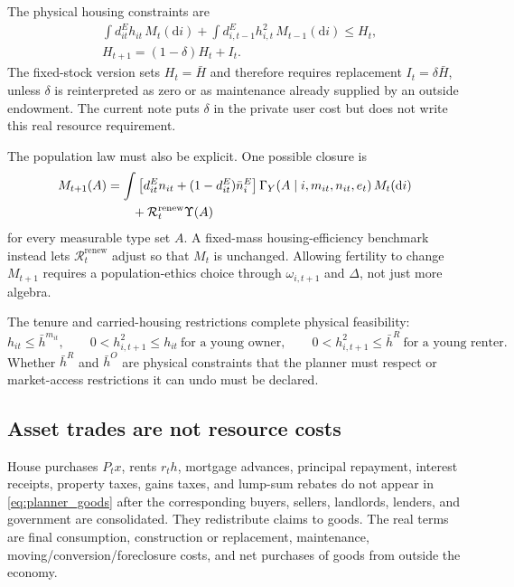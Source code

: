 \documentclass[11pt]{article}
\newcommand{\dd}{\mathrm d}
\newcommand{\1}{\mathbf 1}
\begin{document}
The physical housing constraints are
\begin{align}
&\int d_{it}^E h_{it}\,M_t(\dd i)
+\int d_{i,t-1}^E h_{i,t}^2\,M_{t-1}(\dd i)
\le H_t,
\label{eq:planner_housing}\\
&H_{t+1}=(1-\delta)H_t+I_t.
\label{eq:stock_law}
\end{align}
The fixed-stock version sets $H_t=\bar H$ and therefore requires replacement
$I_t=\delta\bar H$, unless $\delta$ is reinterpreted as zero or as maintenance
already supplied by an outside endowment. The current note puts $\delta$ in
the private user cost but does not write this real resource requirement.

The population law must also be explicit. One possible closure is
\begin{align}
M_{t+1}(A)
&=\int
\left[d_{it}^E n_{it}+(1-d_{it}^E)\bar n_i^E\right]
\Gamma_Y(A\mid i,m_{it},n_{it},e_t)\,M_t(\dd i)
\notag\\
&\qquad+\mathcal R_t^{\mathrm{renew}}\Upsilon(A)
\label{eq:population_law}
\end{align}
for every measurable type set $A$. A fixed-mass housing-efficiency benchmark
instead lets $\mathcal R_t^{\mathrm{renew}}$ adjust so that $M_t$ is unchanged. Allowing fertility to
change $M_{t+1}$ requires a population-ethics choice through
$\omega_{i,t+1}$ and $\Delta$, not just more algebra.

The tenure and carried-housing restrictions complete physical feasibility:
\begin{equation}
h_{it}\le\bar h^{m_{it}},\qquad
0<h_{i,t+1}^2\le h_{it}\ \text{for a young owner},\qquad
0<h_{i,t+1}^2\le\bar h^R\ \text{for a young renter}.
\label{eq:planner_tenure_constraints}
\end{equation}
Whether $\bar h^R$ and $\bar h^O$ are physical constraints that the planner
must respect or market-access restrictions it can undo must be declared.

\subsection{Asset trades are not resource costs}

House purchases $P_tx$, rents $r_th$, mortgage advances, principal repayment,
interest receipts, property taxes, gains taxes, and lump-sum rebates do not
appear in \eqref{eq:planner_goods} after the corresponding buyers, sellers,
landlords, lenders, and government are consolidated. They redistribute claims
to goods. The real terms are final consumption, construction or replacement,
maintenance, moving/conversion/foreclosure costs, and net purchases of goods
from outside the economy.
\end{document}
